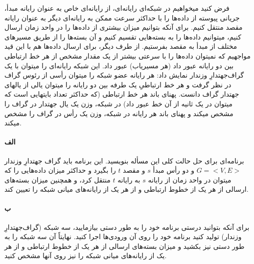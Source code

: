 \documentclass[]{article}
\begin{document}
فرض کنید میخواهیم در شبکه‌ای رایانه‌ای، از رایانه‌ای خاص به عنوان رایانه مبدأ،
جریانی پیوسته از داده‌ها را با حداکثر سرعت ممکن به رایانه‌ای دیگر به عنوان رایانه مقصد منتقل کنیم.
برای آنکه بتوانیم میزان بیشتری از داده‌ها را در واحد زمان ارسال کنیم،
میتوانیم داده‌ها را به بسته‌هایی تقسیم کنیم و آن بسته‌ها را از طریق مسیرهای مختلف از مبدأ به مقصد بفرستیم.
از طرف دیگر، برای ارسال داده‌ها هم با این قید مواجهیم که نمیتوان داده‌ها را با سرعتی بیشتر از یک مقدار مشخص از هر خط ارتباطی بین دو رایانه عبور داد
(هر مسیریاب) عبور داد. 
این شبکه رایانه‌ای را میتوان با یک گراف‌جهتدارِ وزندار نمایش داد:
هر رایانه عضو شبکه را میتوان رأسی از رئوس گراف در نظر گرفت و هر خط ارتباطیِ یک طرفه بین دو رایانه را میتوان یالی از یالهای جهتدار گراف دانست.
پهنای باند هر خط ارتباطی (که حداکثر تعداد بایتهایی است که میتوان در یک ثانیه از آن خط عبور داد) در شبکه،
وزن یک یال جهتدار در گراف را مشخص میکند و پهنای باند هر رایانه در شبکه، وزن یک رأس در گراف را مشخص میکند.

\paragraph*{الف}
برنامه‌ای برای حل حالت کلی این مسأله بنویسید.
این برنامه باید گراف جهتدارِ وزندار $G=<V, E>$ و دو رأس مبدأ $s$ و مقصد $t$ را بگیرد و حداکثر میزان داده‌هایی را که میتوان در واحد زمان از رایانه $s$ به رایانه $t$ منتقل کرد،
و همچنین میزان بسته‌های ارسالی از هر یک از خطوط ارتباطی و از هر یک از رایانه‌های میانی شبکه را تعیین کند.

\paragraph*{ب}
برای آنکه بتوانید درستی برنامه خود را به طور دستی بیازمایید، سه شبکه (گراف‌جهتدارِ وزندار) تولید کنید
برنامه خود را روی آن ورودی‌ها اجرا کنید.
نهایتاً آن سه شبکه را به طور دستی نیز بکشید و میزان بسته‌های ارسالی از هر یک از خطوط ارتباطی و از هر یک از رایانه‌های میانی شبکه را نیز روی آنها مشخص کنید. 
\end{document}
